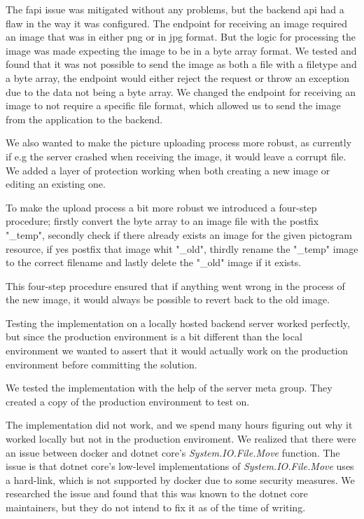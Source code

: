 The \gls{fapi} issue was mitigated without any problems, but the backend \gls{api} had a flaw in the way it was configured. The endpoint for receiving an image required an image that was in either png or in jpg format. But the logic for processing the image was made expecting the image to be in a byte array format. We tested and found that it was not possible to send the image as both a file with a filetype and a byte array, the endpoint would either reject the request or throw an exception due to the data not being a byte array.
We changed the endpoint for receiving an image to not require a specific file format, which allowed us to send the image from the application to the backend.

We also wanted to make the picture uploading process more robust, as currently if e.g the server crashed when receiving the image, it would leave a corrupt file. We added a layer of protection working when both creating a new image or editing an existing one.

To make the upload process a bit more robust we introduced a four-step procedure; firstly convert the byte array to an image file with the postfix "\_temp", secondly check if there already exists an image for the given pictogram resource, if yes postfix that image whit "\_old", thirdly rename the "\_temp" image to the correct filename and lastly delete the "\_old" image if it exists.

This four-step procedure ensured that if anything went wrong in the process of the new image, it would always be possible to revert back to the old image.

Testing the implementation on a locally hosted backend server worked perfectly, but since the production environment is a bit different than the local environment we wanted to assert that it would actually work on the production environment before committing the solution.

We tested the implementation with the help of the server meta group. They created a copy of the production environment to test on. 

The implementation did not work, and we spend many hours figuring out why it worked locally but not in the production enviroment. We realized that there were an issue between docker and dotnet core's \textit{System.IO.File.Move} function. The issue is that dotnet core's low-level implementations of \textit{System.IO.File.Move} uses a hard-link, which is not supported by docker due to some security measures. We researched the issue and found that this was known to the dotnet core maintainers, but they do not intend to fix it as of the time of writing.

